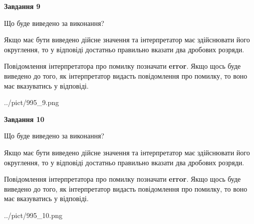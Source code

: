 \documentclass[12pt, ukrainian]{article}
\begin{document}
{\begin {Large}
{\begin {center}\textbf{Завдання 9}\end {center}}\par
Що буде виведено за виконання? \par

Якщо має бути виведено дійсне значення та інтерпретатор має здійснювати його округлення, 
то у відповіді достатньо правильно вказати два дробових розряди.

Повідомлення інтерпретатора про помилку позначати \textbf{error}.
Якщо щось буде виведено до того, як інтерпретатор видасть повідомлення про помилку, 
то воно має вказуватись у відповіді. \par

\begin{center}
	{../pict/995_9.png}
\end{center}
\newpage

{\begin {center}\textbf{Завдання 10}\end {center}}\par
Що буде виведено за виконання? \par

Якщо має бути виведено дійсне значення та інтерпретатор має здійснювати його округлення, 
то у відповіді достатньо правильно вказати два дробових розряди.

Повідомлення інтерпретатора про помилку позначати \textbf{error}.
Якщо щось буде виведено до того, як інтерпретатор видасть повідомлення про помилку, 
то воно має вказуватись у відповіді. \par

\begin{center}
	{../pict/995_10.png}
\end{center}
\newpage

\end {Large}}
\end{document}
